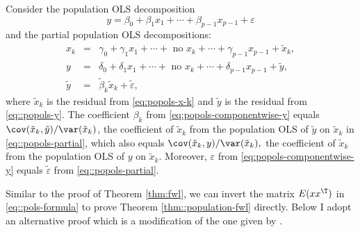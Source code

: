 \begin{theorem}\label{thm::population-fwl}
Consider the population OLS decomposition
\begin{equation}
y= \beta_0  +  \beta_{1}x_{1}+\cdots+\beta_{p-1}x_{p-1}+\varepsilon \label{eq:popols-componentwise-y}
\end{equation}
and the partial population OLS decompositions:
\begin{eqnarray}
x_{k}  &=& \gamma_0 +  \gamma_{1}x_{1}+\cdots+\text{ no }x_{k} + \cdots +\gamma_{p-1}x_{p-1}+\tilde{x}_{k},\label{eq:popols-x-k} \\
y &=& \delta_0 +  \delta_{1}x_{1}+\cdots+\text{ no }x_{k}+ \cdots +\delta_{p-1}x_{p-1}+\tilde{y}, \label{eq::popols-y} \\
\tilde{y} &=& \tilde{\beta}_k  \tilde{x}_{k} + \tilde{\varepsilon}, \label{eq::popols-partial}
\end{eqnarray}
where $\tilde{x}_{k}$ is the residual from \eqref{eq:popols-x-k} and  $\tilde{y}$ is the residual from \eqref{eq::popols-y}. 
The coefficient $\beta_{k}$ from \eqref{eq:popols-componentwise-y} equals $  \cov(\tilde{x}_{k},\tilde{y}) / \var(\tilde{x}_{k})$, the coefficient of $\tilde{x}_{k} $ from the population OLS of $\tilde{y}$ on $\tilde{x}_{k}$ in \eqref{eq::popols-partial}, which also equals 
$
  \cov(\tilde{x}_{k},y) / \var(\tilde{x}_{k}) , 
$
the coefficient of $\tilde{x}_{k} $ from the population OLS of $y$ on $\tilde{x}_{k}$.  Moreover, $\varepsilon $ from \eqref{eq:popols-componentwise-y} equals $\tilde{\varepsilon}$ from \eqref{eq::popols-partial}. 
\end{theorem}


Similar to the proof of Theorem \ref{thm:fwl}, we can invert the matrix $E(xx^{\T})$ in \eqref{eq::pols-formula} to prove Theorem \ref{thm::population-fwl} directly. Below I adopt an alternative proof which is a modification of the one given by \citet{angrist2008mostly}. 


